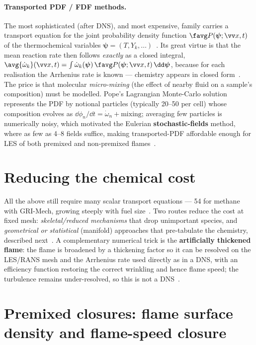 \paragraph{Transported PDF / FDF methods.} The most sophisticated (after DNS), and most expensive, family carries a transport equation for the joint probability density function $\favg P(\boldsymbol\psi;\vv x,t)$ of the thermochemical variables $\boldsymbol\psi=(T,Y_k,\dots)$~\cite{lecture10,veynante2002turbulent}. Its great virtue is that the mean reaction rate then follows \emph{exactly} as a closed integral, $\avg{\dot\omega_k}(\vv x,t)=\int\dot\omega_k(\boldsymbol\psi)\,\favg P(\boldsymbol\psi;\vv x,t)\,\dd\boldsymbol\psi$, because for each realisation the Arrhenius rate is known --- chemistry appears in closed form~\cite{lecture10}. The price is that molecular \emph{micro-mixing} (the effect of nearby fluid on a sample's composition) must be modelled. Pope's Lagrangian Monte-Carlo solution represents the PDF by notional particles (typically 20--50 per cell) whose composition evolves as $\dd\phi_n/\dd t=\dot\omega_n+\text{mixing}$; averaging few particles is numerically noisy, which motivated the Eulerian \textbf{stochastic-fields} method, where as few as 4--8 fields suffice, making transported-PDF affordable enough for LES of both premixed and non-premixed flames~\cite{lecture10,pope2000turbulent}.

\section{Reducing the chemical cost}

All the above still require many scalar transport equations --- 54 for methane with GRI-Mech, growing steeply with fuel size~\cite{lecture10}. Two routes reduce the cost at fixed mesh: \emph{skeletal/reduced mechanisms} that drop unimportant species, and \emph{geometrical or statistical} (manifold) approaches that pre-tabulate the chemistry, described next~\cite{lecture10}. A complementary numerical trick is the \textbf{artificially thickened flame}: the flame is broadened by a thickening factor so it can be resolved on the LES/RANS mesh and the Arrhenius rate used directly as in a DNS, with an efficiency function restoring the correct wrinkling and hence flame speed; the turbulence remains under-resolved, so this is not a DNS~\cite{lecture10}.

\section{Premixed closures: flame surface density and flame-speed closure}

